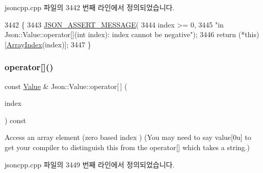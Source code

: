 jsoncpp.\+cpp 파일의 3442 번째 라인에서 정의되었습니다.


\begin{DoxyCode}
3442                                   \{
3443   \hyperlink{json_8h_ad7facdeeca0f495765e3b204c265eadb}{JSON\_ASSERT\_MESSAGE}(
3444       index >= 0,
3445       \textcolor{stringliteral}{"in Json::Value::operator[](int index): index cannot be negative"});
3446   \textcolor{keywordflow}{return} (*\textcolor{keyword}{this})[\hyperlink{class_json_1_1_value_a184a91566cccca7b819240f0d5561c7d}{ArrayIndex}(index)];
3447 \}
\end{DoxyCode}
\mbox{\label{class_json_1_1_value_a46607236038b29695ed80c15895271e4}} 
\subsubsection{\texorpdfstring{operator[]()}{operator[]()}\hspace{0.1cm}{\footnotesize\ttfamily [3/9]}}
{\footnotesize\ttfamily const \hyperlink{class_json_1_1_value}{Value} \& Json\+::\+Value\+::operator\mbox{[}$\,$\mbox{]} (\begin{DoxyParamCaption}\item[{\hyperlink{class_json_1_1_value_a184a91566cccca7b819240f0d5561c7d}{Array\+Index}}]{index }\end{DoxyParamCaption}) const}

Access an array element (zero based index ) (You may need to say \textquotesingle{}value\mbox{[}0u\mbox{]}\textquotesingle{} to get your compiler to distinguish this from the operator\mbox{[}\mbox{]} which takes a string.) 

jsoncpp.\+cpp 파일의 3449 번째 라인에서 정의되었습니다.


